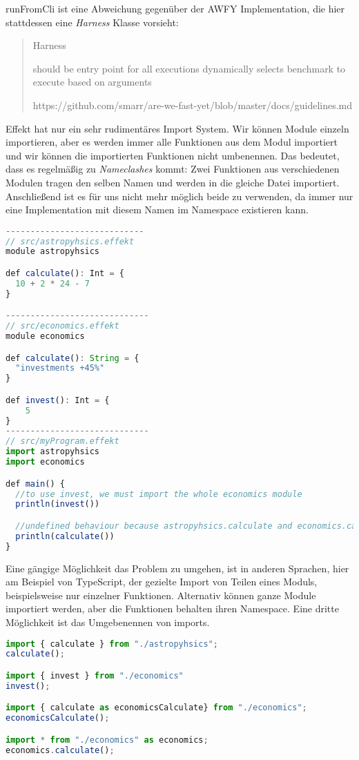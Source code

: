 runFromCli ist eine Abweichung gegenüber der AWFY Implementation, die hier stattdessen eine \textit{Harness} Klasse vorsieht:
\begin{quote}
    Harness

    should be entry point for all executions
    dynamically selects benchmark to execute based on arguments

    https://github.com/smarr/are-we-fast-yet/blob/master/docs/guidelines.md
\end{quote}
Effekt hat nur ein sehr rudimentäres Import System. Wir können Module einzeln importieren, aber es werden immer alle Funktionen aus dem Modul importiert und wir können die importierten Funktionen nicht umbenennen.
Das bedeutet, dass es regelmäßig zu \textit{Nameclashes} kommt: Zwei Funktionen aus verschiedenen Modulen tragen den selben Namen und werden in die gleiche Datei importiert. Anschließend ist es für uns nicht mehr möglich beide zu verwenden, da immer nur eine Implementation mit diesem Namen im Namespace existieren kann.
\begin{lstlisting}[language=javascript]
----------------------------
// src/astropyhsics.effekt
module astropyhsics

def calculate(): Int = {
  10 + 2 * 24 - 7
}

-----------------------------
// src/economics.effekt
module economics

def calculate(): String = {
  "investments +45%"
}

def invest(): Int = {
    5
}
-----------------------------
// src/myProgram.effekt
import astropyhsics
import economics

def main() {
  //to use invest, we must import the whole economics module
  println(invest())

  //undefined behaviour because astropyhsics.calculate and economics.calculate clash
  println(calculate())
}
\end{lstlisting}

Eine gängige Möglichkeit das Problem zu umgehen, ist in anderen Sprachen, hier am Beispiel von TypeScript, der gezielte Import von Teilen eines Moduls, beispielsweise nur einzelner Funktionen. Alternativ können ganze Module importiert werden, aber die Funktionen behalten ihren Namespace.
Eine dritte Möglichkeit ist das Umgebenennen von imports.

\begin{lstlisting}[language=javascript]
import { calculate } from "./astropyhsics";
calculate();

import { invest } from "./economics"
invest();

import { calculate as economicsCalculate} from "./economics";
economicsCalculate();

import * from "./economics" as economics;
economics.calculate();
\end{lstlisting}

